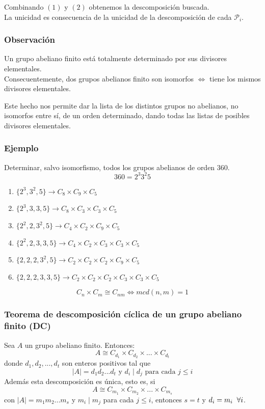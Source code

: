 \documentclass[11pt,a4paper]{article}
\begin{document}
Combinando $(1)$ y $(2)$ obtenemos la descomposición buscada. \\
La unicidad es consecuencia de la unicidad de la descomposición de cada $\mathcal{P}_{i}$.

\subsubsection*{Observación}

Un grupo abeliano finito está totalmente determinado por sus divisores elementales. \\
Consecuentemente, dos grupos abelianos finito son isomorfos $\iff$ tiene los mismos divisores elementales.

Este hecho nos permite dar la lista de los distintos grupos no abelianos, no isomorfos entre sí, de un orden determinado, dando todas las listas de posibles divisores elementales.

\subsubsection*{Ejemplo}

Determinar, salvo isomorfismo, todos los grupos abelianos de orden 360.
$$360 = 2^{3}3^{2}5$$
\begin{enumerate}[label = \arabic*)]
\item $\{2^{3}, 3^{2}, 5\} \to  C_{8} \times C_{9} \times C_{5}$
\item $\{2^{3}, 3, 3, 5\} \to C_{8} \times C_{3} \times C_{3} \times C_{5}$
\item $\{2^{2}, 2, 3^{2}, 5\} \to C_{4} \times C_{2} \times C_{9} \times C_{5}$
\item $\{2^{2}, 2, 3, 3, 5\} \to C_{4} \times C_{2} \times C_{3} \times C_{3} \times C_{5}$
\item $\{2, 2, 2, 3^{2}, 5\} \to C_{2} \times C_{2} \times C_{2} \times C_{9} \times C_{5}$
\item $\{2, 2, 2, 3, 3, 5\} \to C_{2} \times C_{2} \times C_{2} \times C_{3} \times C_{3} \times C_{5}$
\end{enumerate}
$$C_{n} \times C_{m} \cong C_{nm} \iff mcd(n, m) = 1$$

\subsubsection*{Teorema de descomposición cíclica de un grupo abeliano finito (DC)}

Sea $A$ un grupo abeliano finito. Entonces:
$$A \cong C_{d_{1}} \times C_{d_{2}} \times ... \times C_{d_{t}}$$
donde $d_{1}, d_{2}, ..., d_{t}$ son enteros positivos tal que
$$|A| = d_{1}d_{2}...d_{t} \text{ y } d_{i} \mid d_{j} \text{ para cada } j \leq i$$
Además esta descomposición es única, esto es, si
$$A \cong C_{m_{1}} \times C_{m_{2}} \times ... \times C_{m_{s}}$$
con $|A| = m_{1} m_{2} ... m_{s}$ y $m_{i} \mid m_{j}$ para cada $j \leq i$, entonces $s = t$ y $d_{i} = m_{i} \hspace{0.2cm} \forall i$.
\end{document}
